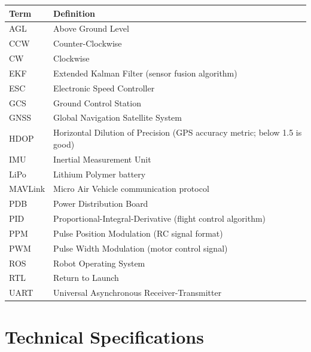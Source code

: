 \documentclass{article}
\begin{document}
\begin{tabular}{ll}
\toprule
\textbf{Term} & \textbf{Definition} \\
\midrule
AGL & Above Ground Level \\
CCW & Counter-Clockwise \\
CW & Clockwise \\
EKF & Extended Kalman Filter (sensor fusion algorithm) \\
ESC & Electronic Speed Controller \\
GCS & Ground Control Station \\
GNSS & Global Navigation Satellite System \\
HDOP & Horizontal Dilution of Precision (GPS accuracy metric; below 1.5 is good) \\
IMU & Inertial Measurement Unit \\
LiPo & Lithium Polymer battery \\
MAVLink & Micro Air Vehicle communication protocol \\
PDB & Power Distribution Board \\
PID & Proportional-Integral-Derivative (flight control algorithm) \\
PPM & Pulse Position Modulation (RC signal format) \\
PWM & Pulse Width Modulation (motor control signal) \\
ROS & Robot Operating System \\
RTL & Return to Launch \\
UART & Universal Asynchronous Receiver-Transmitter \\
\bottomrule
\end{tabular}

\section{Technical Specifications}
\label{app:specs}
\end{document}
